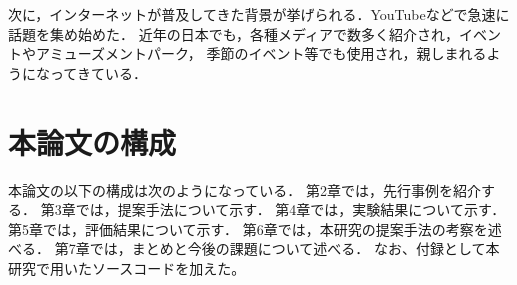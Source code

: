 次に，インターネットが普及してきた背景が挙げられる．YouTubeなどで急速に話題を集め始めた．
近年の日本でも，各種メディアで数多く紹介され，イベントやアミューズメントパーク，
季節のイベント等でも使用され，親しまれるようになってきている\cite{tppm}．


\section{本論文の構成}
本論文の以下の構成は次のようになっている．
第2章では，先行事例を紹介する．
第3章では，提案手法について示す．
第4章では，実験結果について示す．
第5章では，評価結果について示す．
第6章では，本研究の提案手法の考察を述べる．
第7章では，まとめと今後の課題について述べる．
なお、付録として本研究で用いたソースコードを加えた。
